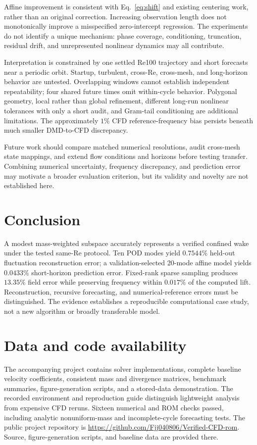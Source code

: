 \documentclass[11pt,a4paper]{article}
\begin{document}
Affine improvement is consistent with Eq.~\eqref{eq:shift} and existing centering work\cite{hirsh}, rather than an original correction. Increasing observation length does not monotonically improve a misspecified zero-intercept regression. The experiments do not identify a unique mechanism: phase coverage, conditioning, truncation, residual drift, and unrepresented nonlinear dynamics may all contribute.

Interpretation is constrained by one settled Re100 trajectory and short forecasts near a periodic orbit. Startup, turbulent, cross-Re, cross-mesh, and long-horizon behavior are untested. Overlapping windows cannot establish independent repeatability; four shared future times omit within-cycle behavior. Polygonal geometry, local rather than global refinement, different long-run nonlinear tolerances with only a short audit, and Gram-tail conditioning are additional limitations. The approximately $1\%$ CFD reference-frequency bias persists beneath much smaller DMD-to-CFD discrepancy.

Future work should compare matched numerical resolutions, audit cross-mesh state mappings, and extend flow conditions and horizons before testing transfer. Combining numerical uncertainty, frequency discrepancy, and prediction error may motivate a broader evaluation criterion, but its validity and novelty are not established here.

\section{Conclusion}
A modest mass-weighted subspace accurately represents a verified confined wake under the tested same-Re protocol. Ten POD modes yield $0.7544\%$ held-out fluctuation reconstruction error; a validation-selected 20-mode affine model yields $0.0433\%$ short-horizon prediction error. Fixed-rank sparse sampling produces $13.35\%$ field error while preserving frequency within $0.017\%$ of the computed lift. Reconstruction, recursive forecasting, and numerical-reference errors must be distinguished. The evidence establishes a reproducible computational case study, not a new algorithm or broadly transferable model.

\section*{Data and code availability}
The accompanying project contains solver implementations, complete baseline velocity coefficients, consistent mass and divergence matrices, benchmark summaries, figure-generation scripts, and a stored-data demonstration. The recorded environment and reproduction guide distinguish lightweight analysis from expensive CFD reruns. Sixteen numerical and ROM checks passed, including analytic nonuniform-mass and incomplete-cycle forecasting tests. The public project repository is \url{https://github.com/Fjj040806/Verified-CFD-rom}. Source, figure-generation scripts, and baseline data are provided there.
\end{document}
